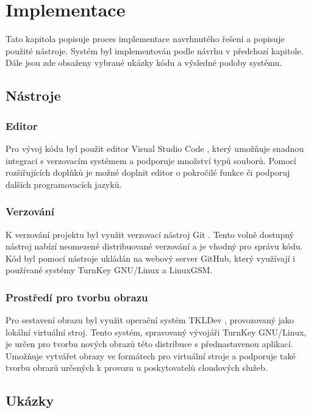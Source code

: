 \chapter{Implementace}

Tato kapitola popisuje proces implementace navrhnutého řešení a popisuje použité nástroje.
Systém byl implementován podle návrhu v předchozí kapitole.
Dále jsou zde obsaženy vybrané ukázky kódu a výsledné podoby systému.

\section{Nástroje}

\subsection{Editor}

Pro vývoj kódu byl použit editor Visual Studio Code \cite{vscode}, který umožňuje snadnou integraci s verzovacím systémem
a podporuje množství typů souborů. Pomocí rozšiřujících doplňků je možné doplnit editor o pokročilé funkce či podporuj
dalších programovacích jazyků.

\subsection{Verzování}

K verzování projektu byl využit verzovací nástroj Git \cite{git}. Tento volně dostupný nástroj nabízí
neomezené distribuované verzování a je vhodný pro správu kódu.
Kód byl pomocí nástroje ukládán na webový server GitHub, který využívají i používané systémy TurnKey GNU/Linux
a LinuxGSM.

\subsection{Prostředí pro tvorbu obrazu}

Pro sestavení obrazu byl využit operační systém TKLDev \cite{tkldev}, provozovaný jako lokální virtuální stroj. Tento systém, spravovaný vývojáři TurnKey GNU/Linux,
je určen pro tvorbu nových obrazů této distribuce s přednastavenou aplikací. Umožňuje vytvářet obrazy ve formátech pro virtuální stroje a podporuje
také tvorbu obrazů určených k provozu u poskytovatelů cloudových služeb.

\section{Ukázky}


